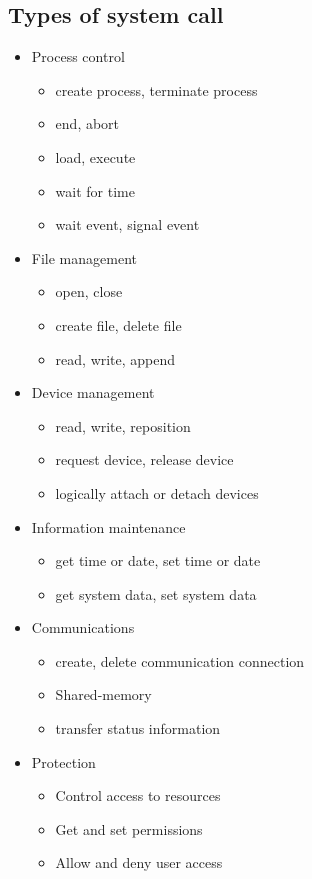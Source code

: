 \newpage
\subsection{Types of system call}

\begin{itemize} 

\item Process control
     \begin{itemize} 
        \item create process, terminate process
        \item end, abort
        \item load, execute
        \item wait for time
        \item wait event, signal event        
     \end{itemize}
     
\item File management
     \begin{itemize} 
        \item open, close
        \item create file, delete file
        \item read, write, append      
     \end{itemize}

\item Device management
     \begin{itemize} 
        \item read, write, reposition
        \item request device, release device
        \item logically attach or detach devices   
     \end{itemize}

\item Information maintenance
     \begin{itemize} 
        \item get time or date, set time or date
        \item get system data, set system data
     \end{itemize}

\item Communications
     \begin{itemize} 
        \item create, delete communication connection
        \item Shared-memory
        \item transfer status information
     \end{itemize}

\item Protection
     \begin{itemize} 
        \item Control access to resources
        \item Get and set permissions
        \item Allow and deny user access
     \end{itemize}
\end{itemize}



